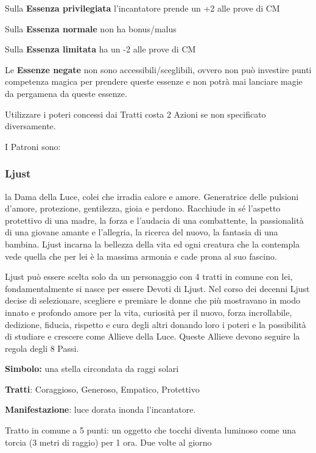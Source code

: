 \documentclass[a4paper,11pt,twoside,openany]{book}
\begin{document}
Sulla \textbf{Essenza privilegiata} l'incantatore prende un +2 alle prove di CM

Sulla \textbf{Essenza normale} non ha bonus/malus

Sulla \textbf{Essenza limitata} ha un -2 alle prove di CM

Le \textbf{Essenze negate} non sono accessibili/sceglibili, ovvero non può investire punti competenza magica per prendere queste essenze e non potrà mai lanciare magie da pergamena da queste essenze.

Utilizzare i poteri concessi dai Tratti costa 2 Azioni se non specificato diversamente.

I Patroni sono:

\subsubsection{Ljust}

\label{ljust}

la Dama della Luce, colei che irradia calore e amore. Generatrice delle pulsioni d'amore, protezione, gentilezza, gioia e perdono. Racchiude in sé l'aspetto protettivo di una madre, la forza e l'audacia di una combattente, la passionalità di una giovane amante e l'allegria, la ricerca del nuovo, la fantasia di una bambina. Ljust incarna la bellezza della vita ed ogni creatura che la contempla vede quella che per lei è la massima armonia e cade prona al suo fascino.

Ljust può essere scelta solo da un personaggio con 4 tratti in comune con lei, fondamentalmente si nasce per essere Devoti di Ljust. Nel corso dei decenni Ljust decise di selezionare, scegliere e premiare le donne che più mostravano in modo innato e profondo amore per la vita, curiosità per il nuovo, forza incrollabile, dedizione, fiducia, rispetto e cura degli altri donando loro i poteri e la possibilità di studiare e crescere come Allieve della Luce. Queste Allieve devono seguire la regola degli 8 Passi.

\textbf{Simbolo:} una stella circondata da raggi solari

\textbf{Tratti}: Coraggioso, Generoso, Empatico, Protettivo

\textbf{Manifestazione}: luce dorata inonda l'incantatore.

\bigskip

Tratto in comune a 5 punti: un oggetto che tocchi diventa luminoso come una torcia (3 metri di raggio) per 1 ora. Due volte al giorno
\end{document}
